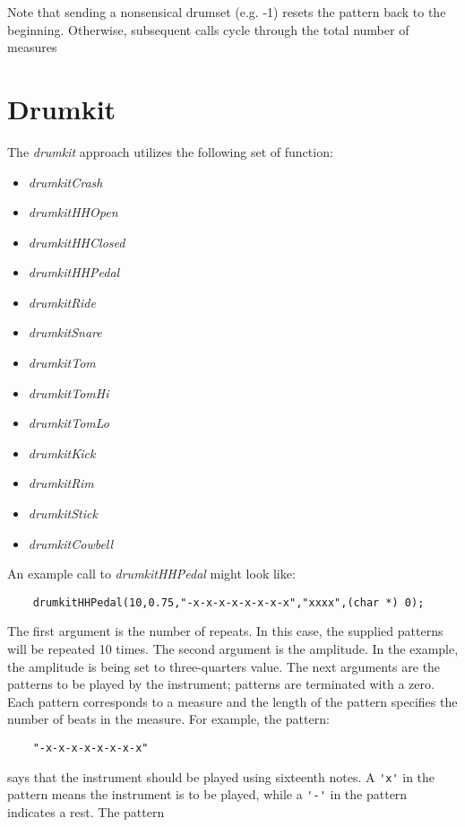 \documentclass{article}
\begin{document}
Note that sending a nonsensical drumset (e.g. -1) resets
the pattern back to the beginning. Otherwise, subsequent calls cycle
through the total number of measures

\section*{Drumkit}

The {\it drumkit} approach utilizes the following set of function:

\begin{itemize}
\item
    {\it drumkitCrash}
\item
    {\it drumkitHHOpen}
\item
    {\it drumkitHHClosed}
\item
    {\it drumkitHHPedal}
\item
    {\it drumkitRide}
\item
    {\it drumkitSnare}
\item
    {\it drumkitTom}
\item
    {\it drumkitTomHi}
\item
    {\it drumkitTomLo}
\item
    {\it drumkitKick}
\item
    {\it drumkitRim}
\item
    {\it drumkitStick}
\item
    {\it drumkitCowbell}
\end{itemize}

An example call to {\it drumkitHHPedal} might look like:

\begin{verbatim}
    drumkitHHPedal(10,0.75,"-x-x-x-x-x-x-x-x","xxxx",(char *) 0);
\end{verbatim}

The first argument is the number of repeats. In this case,
the supplied patterns will be repeated 10 times.
The second argument is the amplitude. In the example, the
amplitude is being set to three-quarters value. The next
arguments are the patterns to be played by the instrument;
patterns are terminated with a zero. Each pattern corresponds
to a measure and the length of the pattern specifies the number
of beats in the measure. For example, the pattern:

\begin{verbatim}
    "-x-x-x-x-x-x-x-x"
\end{verbatim}

says that the instrument should be played using sixteenth notes.
A \verb!'x'! in the pattern means the instrument is to be played,
while a \verb!'-'! in the pattern indicates a rest. The pattern
\end{document}
